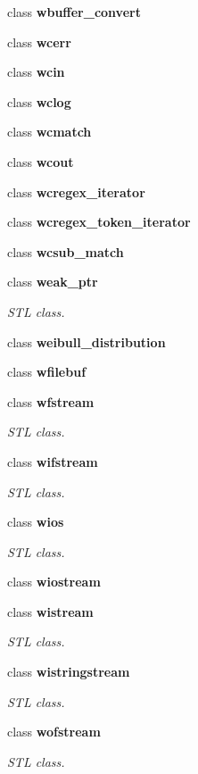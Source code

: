 \begin{DoxyCompactItemize}
class \textbf{ wbuffer\+\_\+convert}
\item 
class \textbf{ wcerr}
\item 
class \textbf{ wcin}
\item 
class \textbf{ wclog}
\item 
class \textbf{ wcmatch}
\item 
class \textbf{ wcout}
\item 
class \textbf{ wcregex\+\_\+iterator}
\item 
class \textbf{ wcregex\+\_\+token\+\_\+iterator}
\item 
class \textbf{ wcsub\+\_\+match}
\item 
class \textbf{ weak\+\_\+ptr}
\begin{DoxyCompactList}\small\item\em S\+TL class. \end{DoxyCompactList}\item 
class \textbf{ weibull\+\_\+distribution}
\item 
class \textbf{ wfilebuf}
\item 
class \textbf{ wfstream}
\begin{DoxyCompactList}\small\item\em S\+TL class. \end{DoxyCompactList}\item 
class \textbf{ wifstream}
\begin{DoxyCompactList}\small\item\em S\+TL class. \end{DoxyCompactList}\item 
class {\bfseries wios}
\begin{DoxyCompactList}\small\item\em S\+TL class. \end{DoxyCompactList}\item 
class \textbf{ wiostream}
\item 
class \textbf{ wistream}
\begin{DoxyCompactList}\small\item\em S\+TL class. \end{DoxyCompactList}\item 
class \textbf{ wistringstream}
\begin{DoxyCompactList}\small\item\em S\+TL class. \end{DoxyCompactList}\item 
class \textbf{ wofstream}
\begin{DoxyCompactList}\small\item\em S\+TL class. \end{DoxyCompactList}\item 

\end{DoxyCompactItemize}
